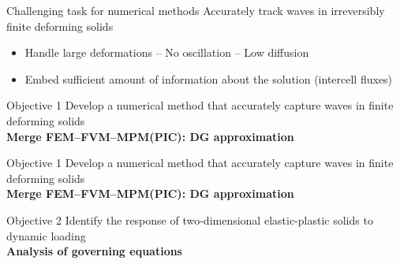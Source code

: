 \begin{withoutheadline}
  \begin{frame}{\text{  }}
    \begin{block}{Challenging task for numerical methods}
      \alert{Accurately track waves in irreversibly finite deforming solids}
      \begin{itemize}
      \item[1-] Handle large deformations -- No oscillation -- Low diffusion
      \item[2-] Embed sufficient amount of information about the solution (intercell fluxes)
      \end{itemize}
    \end{block}\pause
    \begin{overprint}
      \begin{block}{Objective 1}
        Develop a numerical method that accurately capture waves in finite deforming solids \\
        \textbf{Merge FEM--FVM--MPM(PIC): DG approximation}
      \end{block}
      \begin{block}{}
        \centering
        
      \end{block}
      \begin{block}{Objective 1}
        Develop a numerical method that accurately capture waves in finite deforming solids \\
        \textbf{Merge FEM--FVM--MPM(PIC): DG approximation}
      \end{block}
      \begin{block}{Objective 2}
      Identify the response of two-dimensional elastic-plastic solids to dynamic loading \\
      \textbf{Analysis of governing equations} %
    \end{block}
    \end{overprint}
  \end{frame}
\end{withoutheadline}




